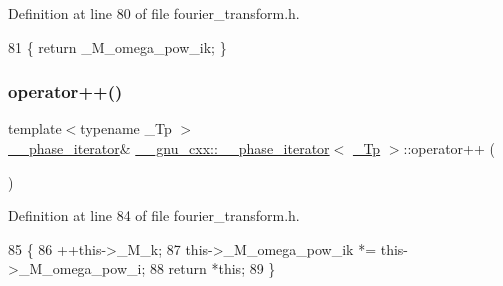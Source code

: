 Definition at line 80 of file fourier\+\_\+transform.\+h.


\begin{DoxyCode}
81       \{ \textcolor{keywordflow}{return} \_M\_omega\_pow\_ik; \}
\end{DoxyCode}
\mbox{\label{class____gnu__cxx_1_1____phase__iterator_a8ef453c6297641600aeacbbeb69e1525}} 
\subsubsection{\texorpdfstring{operator++()}{operator++()}\hspace{0.1cm}{\footnotesize\ttfamily [1/2]}}
{\footnotesize\ttfamily template$<$typename \+\_\+\+Tp $>$ \\
\hyperlink{class____gnu__cxx_1_1____phase__iterator}{\+\_\+\+\_\+phase\+\_\+iterator}\& \hyperlink{class____gnu__cxx_1_1____phase__iterator}{\+\_\+\+\_\+gnu\+\_\+cxx\+::\+\_\+\+\_\+phase\+\_\+iterator}$<$ \hyperlink{namespace____gnu__cxx_a3b19a9c800ca194374ef9172290f7d79}{\+\_\+\+Tp} $>$\+::operator++ (\begin{DoxyParamCaption}{ }\end{DoxyParamCaption})\hspace{0.3cm}{\ttfamily [inline]}}



Definition at line 84 of file fourier\+\_\+transform.\+h.


\begin{DoxyCode}
85       \{
86         ++this->\_M\_k;
87         this->\_M\_omega\_pow\_ik *= this->\_M\_omega\_pow\_i;
88         \textcolor{keywordflow}{return} *\textcolor{keyword}{this};
89       \}
\end{DoxyCode}
\mbox{\label{class____gnu__cxx_1_1____phase__iterator_acb438f7faf5843bd8060214874bdcd81}} 
